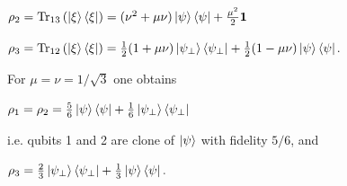 {\quad $\rho_2=\textrm{Tr}_{13}\left({\left|{\xi}\right>\left<{\xi}\right|}\right) = (\nu^2 + \mu\nu)\left|{\psi}\right>\left<{\psi}\right|+\frac{\mu^2}{2}{\mathbf{1}}$

\quad $\rho_3=\textrm{Tr}_{12}\left({\left|{\xi}\right>\left<{\xi}\right|}\right) = \frac{1}{2}(1+\mu\nu)\left|{\psi_\perp}\right>\left<{\psi_\perp}\right|+ \frac{1}{2}(1-\mu\nu)\left|{\psi}\right>\left<{\psi}\right|$.

For $\mu=\nu=1/\sqrt{3}$ one obtains

\quad $\rho_1 = \rho_2 = \frac{5}{6}\left|{\psi}\right>\left<{\psi}\right| + \frac{1}{6}\left|{\psi_\perp}\right>\left<{\psi_\perp}\right|$ 

i.e. qubits 1 and 2 are clone of $\left|{\psi}\right>$ with fidelity $5/6$, and 

\quad $\rho_3 =\frac{2}{3}\left|{\psi_\perp}\right>\left<{\psi_\perp}\right| + \frac{1}{3}\left|{\psi}\right>\left<{\psi}\right|.$ 
}
\toshTableEnd
\bigskip


